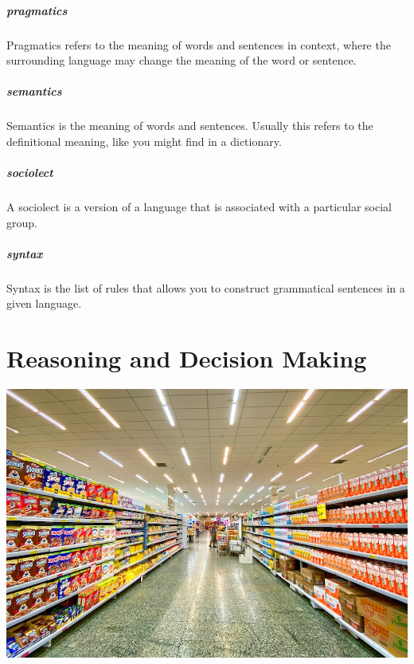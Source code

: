 \documentclass[
]{krantz}
\begin{document}
\paragraph*{pragmatics}\label{pragmatics}

Pragmatics refers to the meaning of words and sentences in context, where the surrounding language may change the meaning of the word or sentence.

\paragraph*{semantics}\label{semantics}

Semantics is the meaning of words and sentences. Usually this refers to the definitional meaning, like you might find in a dictionary.

\paragraph*{sociolect}\label{sociolect}

A sociolect is a version of a language that is associated with a particular social group.

\paragraph*{syntax}\label{syntax}

Syntax is the list of rules that allows you to construct grammatical sentences in a given language.

\chapter{Reasoning and Decision Making}\label{reasoning-and-decision-making}

\begin{center}\includegraphics[width=1\linewidth]{images/ch9/aisle} \end{center}
\end{document}

